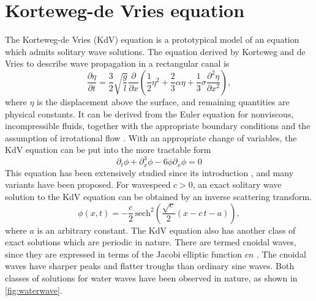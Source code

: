 \documentclass[thesis.tex]{subfiles}
\begin{document}
\section{Korteweg-de Vries equation}

The Korteweg-de Vries (KdV) equation is a prototypical model of an equation which admits solitary wave solutions. The equation derived by Korteweg and de Vries \cite{KdVoriginal} to describe wave propagation in a rectangular canal is  
\[
\frac{\partial \eta}{\partial t} = \frac{3}{2} \sqrt{\frac{g}{l}}
\frac{\partial}{\partial x}
\left( \frac{1}{2} \eta^2 + \frac{2}{3} \alpha \eta + \frac{1}{3} \sigma \frac{\partial^2 \eta}{\partial x^2}\right),
\]
where $\eta$ is the displacement above the surface, and remaining quantities are physical constants. It can be derived from the Euler equation for nonviscous, incompressible fluids, together with the appropriate boundary conditions and the assumption of irrotational flow \cite{SolitonPhysics}. With an appropriate change of variables, the KdV equation can be put into the more tractable form
\begin{equation}\label{KdV3}
\partial_t \phi + \partial_x^3 \phi - 6 \phi \partial_x \phi = 0
\end{equation}
This equation has been extensively studied since its introduction \cite{miles1981,drazin1989solitons,SolitonPhysics}, and many variants have been proposed. For wavespeed $c > 0$, an exact solitary wave solution to the KdV equation can be obtained by an inverse scattering transform.
\[
\phi (x,t)=-{\frac {c}{2}}\,\mathrm {sech} ^{2}\left( \frac{\sqrt {c}}{2}(x-c\,t-a)\right),
\]
where $a$ is an arbitrary constant. The KdV equation also has another class of exact solutions which are periodic in nature. There are termed cnoidal waves, since they are expressed in terms of the Jacobi elliptic function $cn$ \cite{drazin1989solitons}. The cnoidal waves have sharper peaks and flatter troughs than ordinary sine waves. Both classes of solutions for water waves have been observed in nature, as shown in \cref{fig:waterwave}.
\end{document}
